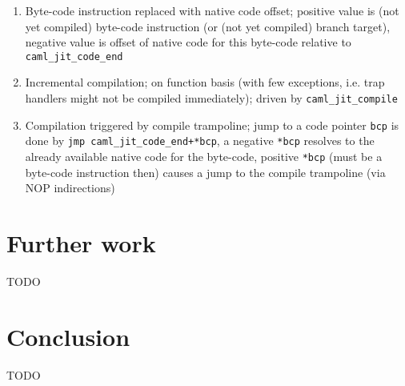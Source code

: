 \documentclass[10pt,a4paper,twocolumn]{article}
\begin{document}
\begin{enumerate}
\item Byte-code instruction replaced with native code offset; positive value is (not yet compiled)
  byte-code instruction (or (not yet compiled) branch target), negative value is offset of native code
  for this byte-code relative to \texttt{caml\_jit\_code\_end}
\item Incremental compilation; on function basis (with few exceptions, i.e. trap handlers might not be
  compiled immediately); driven by \texttt{caml\_jit\_compile}
\item Compilation triggered by compile trampoline; jump to a code pointer \texttt{bcp} is done
  by \texttt{jmp caml\_jit\_code\_end+*bcp}, a negative \texttt{*bcp} resolves to the already available
  native code for the byte-code, positive \texttt{*bcp} (must be a byte-code instruction then) causes
  a jump to the compile trampoline (via NOP indirections)
\end{enumerate}


\section{Further work}

TODO


\section{Conclusion}

TODO




\end{document}
